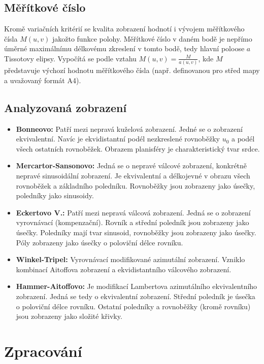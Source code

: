 \subsection*{Měřítkové číslo} 
Kromě variačních kritérií se kvalita zobrazení hodnotí i vývojem měřítkového čísla $M(u,v)$ jakožto funkce polohy.
Měřítkové číslo v daném bodě je nepřímo úměrné maximálnímu délkovému zkreslení v tomto bodě, tedy hlavní poloose $a$ Tissotovy elipsy.
Vypočítá se podle vztahu $M(u,v) = \frac{M}{a(u,v)}$, kde $M$ představuje výchozí hodnotu měřítkového čísla (např. definovanou pro střed mapy a uvažovaný formát A4). 

 
\subsection*{Analyzovaná zobrazení}
\begin{itemize}
	\item \textbf{Bonneovo:} 
	Patří mezi nepravá kuželová zobrazení. Jedné se o zobrazení ekvivalentní. 
	Navíc je ekvidistantní podél nezkreslené rovnoběžky $u_0$ a podél všech ostatních rovnoběžek.
	Obrazem planisféry je charakteristický tvar srdce.
	\item \textbf{Mercartor-Sansonovo:}
	Jedná se o nepravé válcové zobrazení, konkrétně nepravé sinusoidální zobrazení.
	Je ekvivalentní a délkojevné v obrazu všech rovnoběžek a základního poledníku.
	Rovnoběžky jsou zobrazeny jako úsečky, poledníky jako sinusoidy.
	\item \textbf{Eckertovo V.:}
	Patří mezi nepravá válcová zobrazení.
	Jedná se o zobrazení vyrovnávací (kompenzační).
	Rovník a střední poledník jsou zobrazeny jako úsečky.
	Poledníky mají tvar sinusoid, rovnoběžky jsou zobrazeny jako úsečky.
	Póly zobrazeny jako úsečky o poloviční délce rovníku.
	\item \textbf{Winkel-Tripel:}
	Vyrovnávací modifikované azimutální zobrazení. 
	Vzniklo kombinací Aitoffova zobrazení a ekvidistantního válcového zobrazení.
	
	\item \textbf{Hammer-Aitoffovo:}
	Je modifikací Lambertova azimutálního ekvivalentního zobrazení.
	Jedná se tedy o ekvivalentní zobrazení.
	Střední poledník je úsečka o poloviční délce rovníku.
	Ostatní poledníky a rovnoběžky (kromě rovníku) jsou zobrazeny jako složité křivky.
\end{itemize}


\section*{Zpracování}
